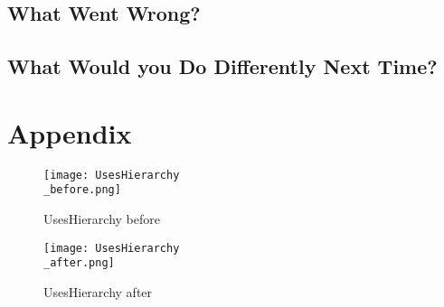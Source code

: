 \documentclass{article}
\begin{document}

\subsection{What Went Wrong?}


\subsection{What Would you Do Differently Next Time?}


\section{Appendix}\label{appendix}

\begin{figure}
\begin{minipage}[c]{0.45\linewidth}
\texttt{[image: UsesHierarchy\\\_before.png]}
\caption{UsesHierarchy before}
\end{minipage}
\hfill
\begin{minipage}[c]{0.45\linewidth}
\texttt{[image: UsesHierarchy\\\_after.png]}
\caption{UsesHierarchy after}
\end{minipage}%
\end{figure}
\end{document}
